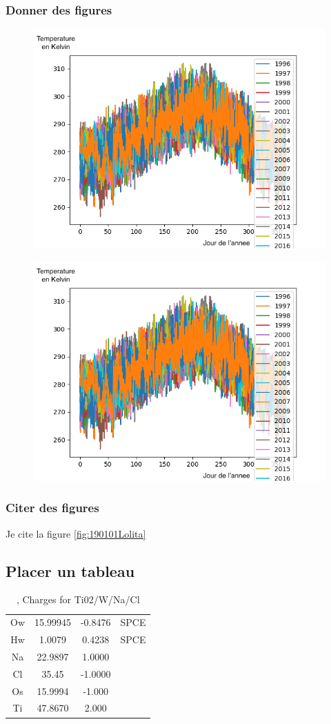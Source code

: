 \documentclass[11pt,a4paper]{article}
\begin{document}
\subsubsection{Donner des figures}

\begin{figure}
  \includegraphics[width=0.48 \textwidth]{./imagesTIPE/temperature.png}\quad
\end{figure}
\begin{figure}
  \includegraphics[width=0.48 \textwidth]{./imagesTIPE/temperature.png}\quad
\end{figure}

\subsubsection{Citer des figures}
Je cite la figure \ref{fig:190101Lolita}
\subsection{Placer un tableau}
\begin{table}[ht]
\begin{tabular}{cccc}\hline
\hline
Ow& 15.99945& -0.8476&SPCE\\
Hw&  1.0079 &  0.4238&SPCE\\
Na& 22.9897 &  1.0000&\\         
Cl& 35.45   & -1.0000&\\
Os& 15.9994 & -1.000 &\\   
Ti& 47.8670 &  2.000 &\\  
\hline 
\end{tabular}                     
\caption{\label{MonTableau}, Charges for Ti02/W/Na/Cl}
\end{table}
\end{document}
